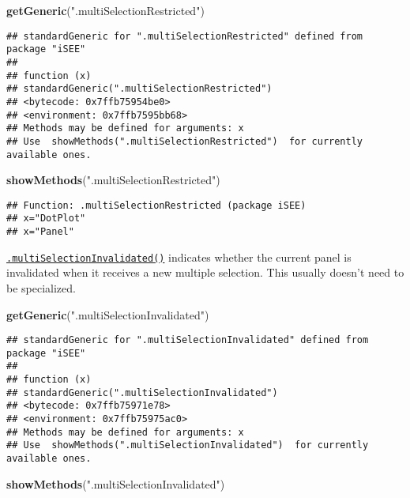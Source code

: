 \documentclass[
]{book}
\newenvironment{Shaded}{\begin{snugshade}}{\end{snugshade}}
\newcommand{\KeywordTok}[1]{\textcolor[rgb]{0.13,0.29,0.53}{\textbf{#1}}}
\newcommand{\NormalTok}[1]{#1}
\newcommand{\StringTok}[1]{\textcolor[rgb]{0.31,0.60,0.02}{#1}}
\begin{document}
\begin{Shaded}
\begin{Highlighting}[]
\KeywordTok{getGeneric}\NormalTok{(}\StringTok{".multiSelectionRestricted"}\NormalTok{)}
\end{Highlighting}
\end{Shaded}

\begin{verbatim}
## standardGeneric for ".multiSelectionRestricted" defined from package "iSEE"
## 
## function (x) 
## standardGeneric(".multiSelectionRestricted")
## <bytecode: 0x7ffb75954be0>
## <environment: 0x7ffb7595bb68>
## Methods may be defined for arguments: x
## Use  showMethods(".multiSelectionRestricted")  for currently available ones.
\end{verbatim}

\begin{Shaded}
\begin{Highlighting}[]
\KeywordTok{showMethods}\NormalTok{(}\StringTok{".multiSelectionRestricted"}\NormalTok{)}
\end{Highlighting}
\end{Shaded}

\begin{verbatim}
## Function: .multiSelectionRestricted (package iSEE)
## x="DotPlot"
## x="Panel"
\end{verbatim}

\href{https://isee.github.io/iSEE/reference/multi-select-generics.html}{\texttt{.multiSelectionInvalidated()}} indicates whether the current panel is invalidated when it receives a new multiple selection.
This usually doesn't need to be specialized.

\begin{Shaded}
\begin{Highlighting}[]
\KeywordTok{getGeneric}\NormalTok{(}\StringTok{".multiSelectionInvalidated"}\NormalTok{)}
\end{Highlighting}
\end{Shaded}

\begin{verbatim}
## standardGeneric for ".multiSelectionInvalidated" defined from package "iSEE"
## 
## function (x) 
## standardGeneric(".multiSelectionInvalidated")
## <bytecode: 0x7ffb75971e78>
## <environment: 0x7ffb75975ac0>
## Methods may be defined for arguments: x
## Use  showMethods(".multiSelectionInvalidated")  for currently available ones.
\end{verbatim}

\begin{Shaded}
\begin{Highlighting}[]
\KeywordTok{showMethods}\NormalTok{(}\StringTok{".multiSelectionInvalidated"}\NormalTok{)}
\end{Highlighting}
\end{Shaded}
\end{document}

